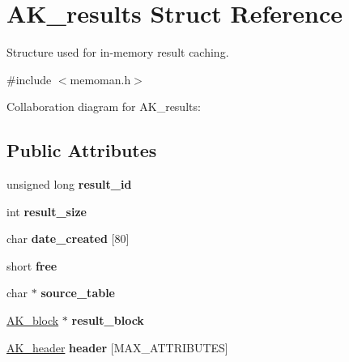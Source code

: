 \hypertarget{structAK__results}{\section{A\+K\+\_\+results Struct Reference}
\label{structAK__results}
}


Structure used for in-\/memory result caching.  




{\ttfamily \#include $<$memoman.\+h$>$}



Collaboration diagram for A\+K\+\_\+results\+:
\subsection*{Public Attributes}
\begin{DoxyCompactItemize}
\item 
\hypertarget{structAK__results_a711198cb42416424b8ac85a9a5c33666}{unsigned long {\bfseries result\+\_\+id}}\label{structAK__results_a711198cb42416424b8ac85a9a5c33666}

\item 
\hypertarget{structAK__results_a0247e1e7bc724494fa4d834412785f65}{int {\bfseries result\+\_\+size}}\label{structAK__results_a0247e1e7bc724494fa4d834412785f65}

\item 
\hypertarget{structAK__results_a5eac49f04f7882ab4c0e7552cbfd1b61}{char {\bfseries date\+\_\+created} \mbox{[}80\mbox{]}}\label{structAK__results_a5eac49f04f7882ab4c0e7552cbfd1b61}

\item 
\hypertarget{structAK__results_a76737ffacf19dd180b856a8bf28f7cb1}{short {\bfseries free}}\label{structAK__results_a76737ffacf19dd180b856a8bf28f7cb1}

\item 
\hypertarget{structAK__results_a3bbe860a120adfff7f78b228785abae9}{char $\ast$ {\bfseries source\+\_\+table}}\label{structAK__results_a3bbe860a120adfff7f78b228785abae9}

\item 
\hypertarget{structAK__results_aebd697e8f81547bb7b4c27ff944e5913}{\hyperlink{structAK__block}{A\+K\+\_\+block} $\ast$ {\bfseries result\+\_\+block}}\label{structAK__results_aebd697e8f81547bb7b4c27ff944e5913}

\item 
\hypertarget{structAK__results_adce1e1dcd808bb24a122661aa7fbfe7b}{\hyperlink{structAK__header}{A\+K\+\_\+header} {\bfseries header} \mbox{[}M\+A\+X\+\_\+\+A\+T\+T\+R\+I\+B\+U\+T\+E\+S\mbox{]}}\label{structAK__results_adce1e1dcd808bb24a122661aa7fbfe7b}

\end{DoxyCompactItemize}


